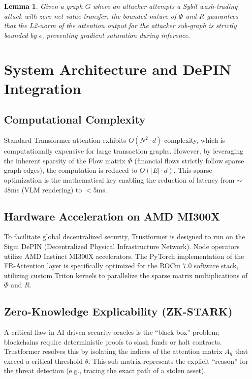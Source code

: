 \documentclass[conference,10pt]{IEEEtran}
\newtheorem{lemma}{Lemma}
\begin{document}
\begin{lemma}
Given a graph $G$ where an attacker attempts a Sybil wash-trading attack with zero net-value transfer, the bounded nature of $\Phi$ and $R$ guarantees that the L2-norm of the attention output for the attacker sub-graph is strictly bounded by $\epsilon$, preventing gradient saturation during inference.
\end{lemma}

\section{System Architecture and DePIN Integration}

\subsection{Computational Complexity}
Standard Transformer attention exhibits $O(N^2 \cdot d)$ complexity, which is computationally expensive for large transaction graphs. However, by leveraging the inherent sparsity of the Flow matrix $\Phi$ (financial flows strictly follow sparse graph edges), the computation is reduced to $O(|E| \cdot d)$. This sparse optimization is the mathematical key enabling the reduction of latency from $\sim$48ms (VLM rendering) to $<$5ms.

\subsection{Hardware Acceleration on AMD MI300X}
To facilitate global decentralized security, Trustformer is designed to run on the Sigui DePIN (Decentralized Physical Infrastructure Network). Node operators utilize AMD Instinct MI300X accelerators. The PyTorch implementation of the FR-Attention layer is specifically optimized for the ROCm 7.0 software stack, utilizing custom Triton kernels to parallelize the sparse matrix multiplications of $\Phi$ and $R$.

\subsection{Zero-Knowledge Explicability (ZK-STARK)}
A critical flaw in AI-driven security oracles is the ``black box'' problem; blockchains require deterministic proofs to slash funds or halt contracts. Trustformer resolves this by isolating the indices of the attention matrix $A_h$ that exceed a critical threshold $\theta$. This sub-matrix represents the explicit ``reason'' for the threat detection (e.g., tracing the exact path of a stolen asset).
\end{document}
